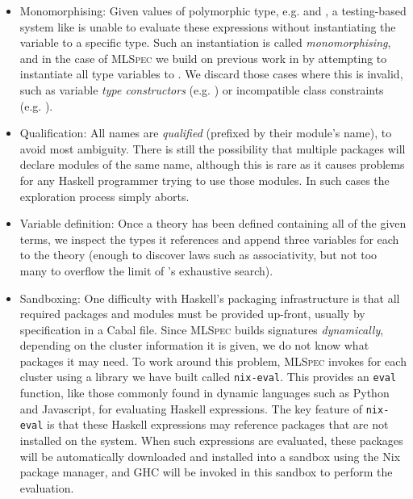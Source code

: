 \begin{itemize}
  \item{Monomorphising}: Given values of polymorphic type, e.g.  and , a testing-based system like \qspec{} is unable to evaluate these expressions without instantiating the variable  to a specific type. Such an instantiation is called \emph{monomorphising}, and in the case of \textsc{MLSpec} we build on previous work in \qcheck{} by attempting to instantiate all type variables to . We discard those cases where this is invalid, such as variable \emph{type constructors} (e.g. ) or incompatible class constraints (e.g. ).

  \item{Qualification}: All names are \emph{qualified} (prefixed by their module's name), to avoid most ambiguity. There is still the possibility that multiple packages will declare modules of the same name, although this is rare as it causes problems for any Haskell programmer trying to use those modules. In such cases the exploration process simply aborts.

  \item{Variable definition}: Once a \qspec{} theory has been defined containing all of the given terms, we inspect the types it references and append three variables for each to the theory (enough to discover laws such as associativity, but not too many to overflow the limit of \qspec{}'s exhaustive search).

  \item{Sandboxing}: One difficulty with Haskell's packaging infrastructure is that all required packages and modules must be provided up-front, usually by specification in a Cabal file. Since \textsc{MLSpec} builds signatures \emph{dynamically}, depending on the cluster information it is given, we do not know what packages it may need. To work around this problem, \textsc{MLSpec} invokes \qspec{} for each cluster using a library we have built called \texttt{nix-eval}. This provides an \texttt{eval} function, like those commonly found in dynamic languages such as Python and Javascript, for evaluating Haskell expressions. The key feature of \texttt{nix-eval} is that these Haskell expressions may reference packages that are not installed on the system. When such expressions are evaluated, these packages will be automatically downloaded and installed into a sandbox using the Nix package manager, and GHC will be invoked in this sandbox to perform the evaluation.

\end{itemize}

